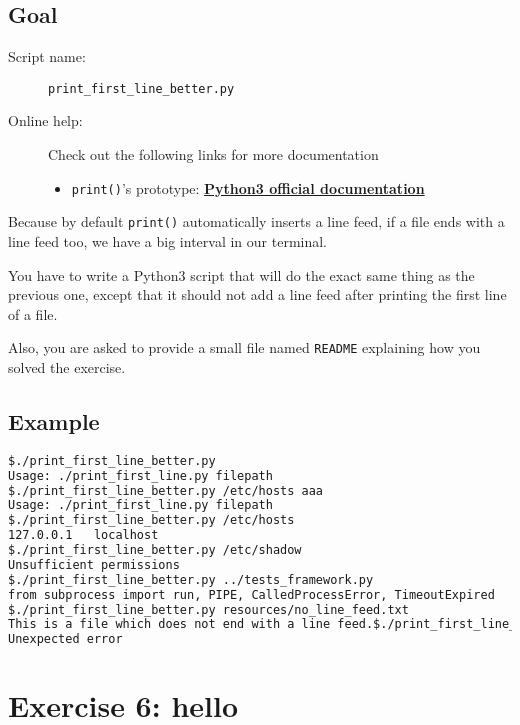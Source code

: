 \documentclass[12pt]{article}
\let\oldhref\href
\renewcommand{\href}[2]{\oldhref{#1}{\bfseries#2}}
\begin{document}
\subsection{Goal}

\begin{description}
        \item[Script name:] \texttt{print\_first\_line\_better.py}
        \item[Online help:] Check out the following links for more documentation
	\begin{itemize}
		\item \texttt{print()}'s prototype: \href{https://docs.python.org/3/library/functions.html\#print}{Python3 official documentation}
	\end{itemize}
\end{description}

Because by default \texttt{print()} automatically inserts a line feed, if a file ends with a line feed too, we have a big interval in our terminal.

You have to write a Python3 script that will do the exact same thing as the previous one, except that it should not add a line feed after printing the first line of a file.

Also, you are asked to provide a small file named \texttt{README} explaining how you solved the exercise.

\subsection{Example}

\begin{lstlisting}[language=bash]
$./print_first_line_better.py 
Usage: ./print_first_line.py filepath
$./print_first_line_better.py /etc/hosts aaa
Usage: ./print_first_line.py filepath
$./print_first_line_better.py /etc/hosts
127.0.0.1	localhost
$./print_first_line_better.py /etc/shadow
Unsufficient permissions
$./print_first_line_better.py ../tests_framework.py 
from subprocess import run, PIPE, CalledProcessError, TimeoutExpired
$./print_first_line_better.py resources/no_line_feed.txt 
This is a file which does not end with a line feed.$./print_first_line_better.py resources/ # ^ Notice the difference?
Unexpected error
\end{lstlisting}

\section{Exercise 6: hello}
\end{document}
